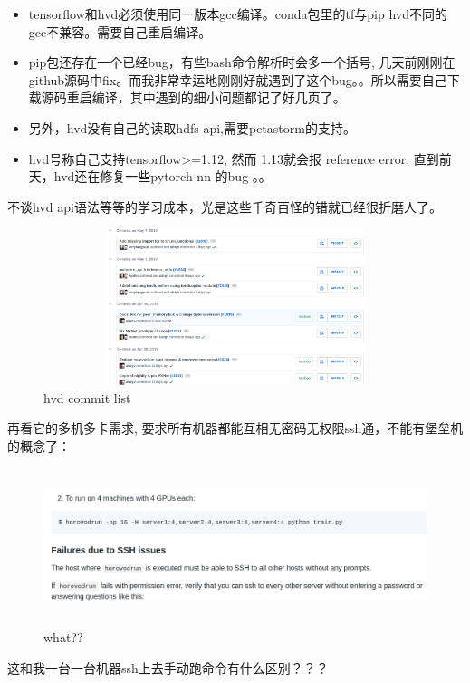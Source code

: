 \documentclass[12pt,a4paper,oneside]{article}
\begin{document}
\begin{CJK*}{UTF8}{gbsn}
\begin{itemize}
\item tensorflow和hvd必须使用同一版本gcc编译。conda包里的tf与pip hvd不同的gcc不兼容。需要自己重启编译。
 
\item pip包还存在一个已经bug，有些bash命令解析时会多一个括号, 几天前刚刚在github源码中fix。而我非常幸运地刚刚好就遇到了这个bug。。所以需要自己下载源码重启编译，其中遇到的细小问题都记了好几页了。 
 
\item 另外，hvd没有自己的读取hdfs api,需要petastorm的支持。
 
\item hvd号称自己支持tensorflow>=1.12, 然而 1.13就会报 reference error. 直到前天，hvd还在修复一些pytorch nn 的bug 。。
\end{itemize}

不谈hvd api语法等等的学习成本，光是这些千奇百怪的错就已经很折磨人了。

\begin{figure}[H] 
\centering
\includegraphics[width=5in,height=1.8in]{hvd_commit}
\caption{hvd commit list}
\end{figure}

再看它的多机多卡需求, 要求所有机器都能互相无密码无权限ssh通，不能有堡垒机的概念了：

\begin{figure}[H] 
\centering
\includegraphics[width=6in,height=1.8in]{hvd_ssh}
\caption{what??}
\end{figure}

这和我一台一台机器ssh上去手动跑命令有什么区别？？？


\end{CJK*}
\end{document}
